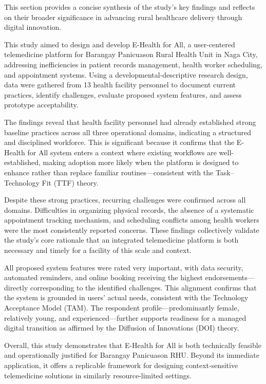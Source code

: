\documentclass{research}
\begin{document}
This section provides a concise synthesis of the study's key findings and reflects on their
broader significance in advancing rural healthcare delivery through digital innovation.

This study aimed to design and develop E-Health for All, a user-centered telemedicine platform for
Barangay Panicuason Rural Health Unit in Naga City, addressing inefficiencies in patient records
management, health worker scheduling, and appointment systems. Using a developmental-descriptive
research design, data were gathered from 13 health facility personnel to document current
practices, identify challenges, evaluate proposed system features, and assess prototype
acceptability.

The findings reveal that health facility personnel had already established strong baseline
practices across all three operational domains, indicating a structured and disciplined workforce.
This is significant because it confirms that the E-Health for All system enters a context where
existing workflows are well-established, making adoption more likely when the platform is designed
to enhance rather than replace familiar routines---consistent with the Task--Technology Fit (TTF)
theory.

Despite these strong practices, recurring challenges were confirmed across all domains.
Difficulties in organizing physical records, the absence of a systematic appointment tracking
mechanism, and scheduling conflicts among health workers were the most consistently reported
concerns. These findings collectively validate the study's core rationale that an integrated
telemedicine platform is both necessary and timely for a facility of this scale and context.

All proposed system features were rated very important, with data security, automated reminders,
and online booking receiving the highest endorsements---directly corresponding to the identified
challenges. This alignment confirms that the system is grounded in users' actual needs, consistent
with the Technology Acceptance Model (TAM). The respondent profile---predominantly female,
relatively young, and experienced---further supports readiness for a managed digital transition
as affirmed by the Diffusion of Innovations (DOI) theory.

Overall, this study demonstrates that E-Health for All is both technically feasible and
operationally justified for Barangay Panicuason RHU. Beyond its immediate application, it offers
a replicable framework for designing context-sensitive telemedicine solutions in similarly
resource-limited settings.
\end{document}
